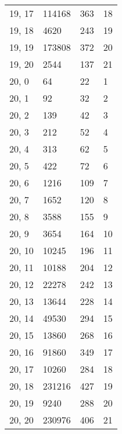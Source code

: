 \begin{table}
\begin{tabular}{llll}
19, 17 &  114168 &  363 &    18 \\
19, 18 &    4620 &  243 &    19 \\
19, 19 &  173808 &  372 &    20 \\
19, 20 &    2544 &  137 &    21 \\
20, 0  &      64 &   22 &     1 \\
20, 1  &      92 &   32 &     2 \\
20, 2  &     139 &   42 &     3 \\
20, 3  &     212 &   52 &     4 \\
20, 4  &     313 &   62 &     5 \\
20, 5  &     422 &   72 &     6 \\
20, 6  &    1216 &  109 &     7 \\
20, 7  &    1652 &  120 &     8 \\
20, 8  &    3588 &  155 &     9 \\
20, 9  &    3654 &  164 &    10 \\
20, 10 &   10245 &  196 &    11 \\
20, 11 &   10188 &  204 &    12 \\
20, 12 &   22278 &  242 &    13 \\
20, 13 &   13644 &  228 &    14 \\
20, 14 &   49530 &  294 &    15 \\
20, 15 &   13860 &  268 &    16 \\
20, 16 &   91860 &  349 &    17 \\
20, 17 &   10260 &  284 &    18 \\
20, 18 &  231216 &  427 &    19 \\
20, 19 &    9240 &  288 &    20 \\
20, 20 &  230976 &  406 &    21 \\
\bottomrule
\end{tabular}
\end{table}

